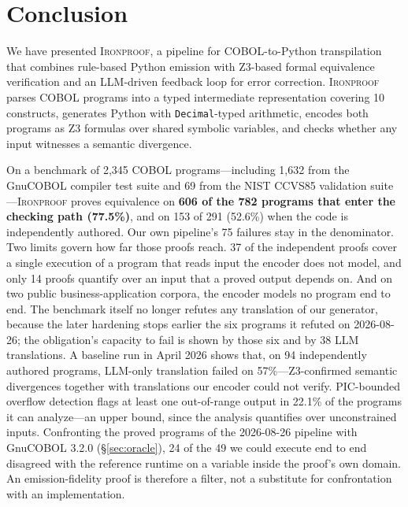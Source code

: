 \documentclass[sigconf,nonacm]{acmart}
\begin{document}

\section{Conclusion}\label{sec:conclusion}

We have presented \textsc{Ironproof}, a pipeline for COBOL-to-Python transpilation that combines rule-based Python emission with Z3-based formal equivalence verification and an LLM-driven feedback loop for error correction. \textsc{Ironproof} parses COBOL programs into a typed intermediate representation covering 10 constructs, generates Python with \texttt{Decimal}-typed arithmetic, encodes both programs as Z3 formulas over shared symbolic variables, and checks whether any input witnesses a semantic divergence.

On a benchmark of 2{,}345 COBOL programs---including 1{,}632 from the GnuCOBOL compiler test suite and 69 from the NIST CCVS85 validation suite---\textsc{Ironproof} proves equivalence on \textbf{606 of the 782 programs that enter the checking path (77.5\%)}, and on 153 of 291 (52.6\%) when the code is independently authored. Our own pipeline's 75 failures stay in the denominator. Two limits govern how far those proofs reach. 37 of the independent proofs cover a single execution of a program that reads input the encoder does not model, and only 14 proofs quantify over an input that a proved output depends on. And on two public business-application corpora, the encoder models no program end to end. The benchmark itself no longer refutes any translation of our generator, because the later hardening stops earlier the six programs it refuted on 2026-08-26; the obligation's capacity to fail is shown by those six and by 38 LLM translations. A baseline run in April 2026 shows that, on 94 independently authored programs, LLM-only translation failed on 57\%---Z3-confirmed semantic divergences together with translations our encoder could not verify. PIC-bounded overflow detection flags at least one out-of-range output in 22.1\% of the programs it can analyze---an upper bound, since the analysis quantifies over unconstrained inputs. Confronting the proved programs of the 2026-08-26 pipeline with GnuCOBOL 3.2.0 (\S\ref{sec:oracle}), 24 of the 49 we could execute end to end disagreed with the reference runtime on a variable inside the proof's own domain. An emission-fidelity proof is therefore a filter, not a substitute for confrontation with an implementation.
\end{document}
